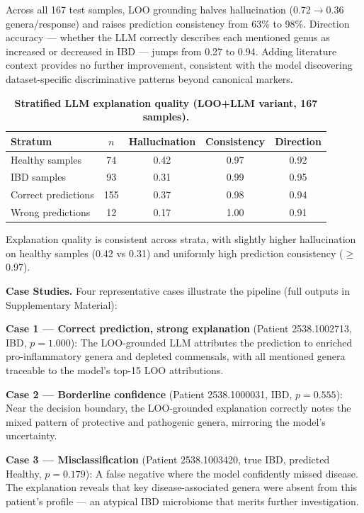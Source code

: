 \documentclass[11pt,a4paper]{article}
\begin{document}
Across all 167 test samples, LOO grounding halves hallucination (0.72$\rightarrow$0.36 genera/response) and raises prediction consistency from 63\% to 98\%. Direction accuracy --- whether the LLM correctly describes each mentioned genus as increased or decreased in IBD --- jumps from 0.27 to 0.94. Adding literature context provides no further improvement, consistent with the model discovering dataset-specific discriminative patterns beyond canonical markers.

\begin{table}[ht]
\centering
\caption{\textbf{Stratified LLM explanation quality (LOO+LLM variant, 167 samples).}}
\label{tab:llm_stratified}
\begin{tabular}{lcccc}
\toprule
\textbf{Stratum} & $n$ & \textbf{Hallucination} & \textbf{Consistency} & \textbf{Direction} \\
\midrule
Healthy samples & 74 & 0.42 & 0.97 & 0.92 \\
IBD samples & 93 & 0.31 & 0.99 & 0.95 \\
Correct predictions & 155 & 0.37 & 0.98 & 0.94 \\
Wrong predictions & 12 & 0.17 & 1.00 & 0.91 \\
\bottomrule
\end{tabular}
\end{table}

Explanation quality is consistent across strata, with slightly higher hallucination on healthy samples (0.42 vs 0.31) and uniformly high prediction consistency ($\geq$0.97).

\textbf{Case Studies.} Four representative cases illustrate the pipeline (full outputs in Supplementary Material):

\textbf{Case 1 --- Correct prediction, strong explanation} (Patient 2538.1002713, IBD, $p{=}1.000$): The LOO-grounded LLM attributes the prediction to enriched pro-inflammatory genera and depleted commensals, with all mentioned genera traceable to the model's top-15 LOO attributions.

\textbf{Case 2 --- Borderline confidence} (Patient 2538.1000031, IBD, $p{=}0.555$): Near the decision boundary, the LOO-grounded explanation correctly notes the mixed pattern of protective and pathogenic genera, mirroring the model's uncertainty.

\textbf{Case 3 --- Misclassification} (Patient 2538.1003420, true IBD, predicted Healthy, $p{=}0.179$): A false negative where the model confidently missed disease. The explanation reveals that key disease-associated genera were absent from this patient's profile --- an atypical IBD microbiome that merits further investigation.
\end{document}
